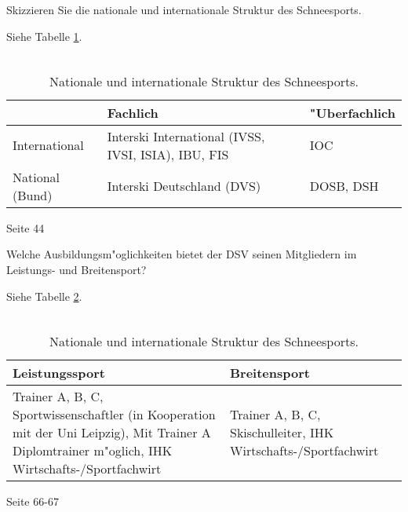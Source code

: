 \begin{question}{4}
Skizzieren Sie die nationale und internationale Struktur des Schneesports.
\end{question}
\begin{solution}
Siehe Tabelle \ref{strukturschneesport}.\\\\
\begin{table}
\caption{Nationale und internationale Struktur des Schneesports.}
  \label{strukturschneesport}
  \scriptsize
  \begin{center}
    \begin{tabular}{p{}|p{}|p{}}
       & \textbf{Fachlich} & \textbf{"Uberfachlich}\\
    \hline
      International & Interski International (IVSS, IVSI, ISIA), IBU, FIS & IOC\\
      National (Bund) & Interski Deutschland (DVS) & DOSB, DSH
    \end{tabular}
  \end{center}
\end{table}
 Seite 44
\end{solution}
\begin{question}{4}
Welche Ausbildungsm"oglichkeiten bietet der DSV seinen Mitgliedern im Leistungs- und Breitensport?
\end{question}
\begin{solution}
Siehe Tabelle \ref{ausbildungen}.\\\\
\begin{table}
\caption{Nationale und internationale Struktur des Schneesports.}
  \label{ausbildungen}
  \scriptsize
  \begin{center}
    \begin{tabular}{p{}|p{}}
       \textbf{Leistungssport} & \textbf{Breitensport}\\
    \hline
      Trainer A, B, C, Sportwissenschaftler (in Kooperation mit der Uni Leipzig), Mit Trainer A Diplomtrainer m"oglich, IHK Wirtschafts-/Sportfachwirt & Trainer A, B, C, Skischulleiter, IHK Wirtschafts-/Sportfachwirt
    \end{tabular}
  \end{center}
\end{table}
 Seite 66-67
\end{solution}

